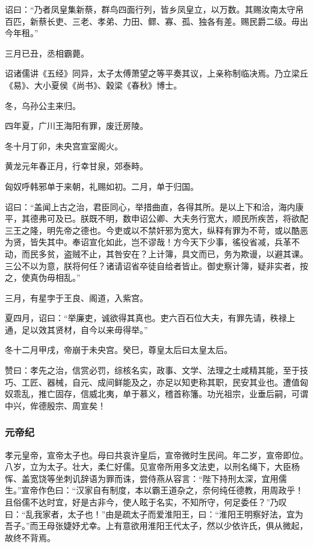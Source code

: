 \documentclass[]{article}
\begin{document}
诏曰：``乃者凤皇集新蔡，群鸟四面行列，皆乡凤皇立，以万数。其赐汝南太守帛百匹，新蔡长吏、三老、孝弟、力田、鳏、寡、孤、独各有差。赐民爵二级。毋出今年租。''

三月已丑，丞相霸薨。

诏诸儒讲《五经》同异，太子太傅萧望之等平奏其议，上亲称制临决焉。乃立梁丘《易》、大小夏侯《尚书》、穀梁《春秋》博士。

冬，乌孙公主来归。

四年夏，广川王海阳有罪，废迁房陵。

冬十月丁卯，未央宫宣室阁火。

黄龙元年春正月，行幸甘泉，郊泰畤。

匈奴呼韩邪单于来朝，礼赐如初。二月，单于归国。

诏曰：``盖闻上古之治，君臣同心，举措曲直，各得其所。是以上下和洽，海内康平，其德弗可及已。朕既不明，数申诏公卿、大夫务行宽大，顺民所疾苦，将欲配三王之隆，明先帝之德也。今吏或以不禁奸邪为宽大，纵释有罪为不苛，或以酷恶为贤，皆失其中。奉诏宣化如此，岂不谬哉！方今天下少事，徭役省减，兵革不动，而民多贫，盗贼不止，其咎安在？上计簿，具文而已，务为欺谩，以避其课。三公不以为意，朕将何任？诸请诏省卒徒自给者皆止。御史察计簿，疑非实者，按之，使真伪毋相乱。''

三月，有星孛于王良、阁道，入紫宫。

夏四月，诏曰：``举廉吏，诚欲得其真也。吏六百石位大夫，有罪先请，秩禄上通，足以效其贤材，自今以来毋得举。''

冬十二月甲戌，帝崩于未央宫。癸巳，尊皇太后曰太皇太后。

赞曰：孝先之治，信赏必罚，综核名实，政事、文学、法理之士咸精其能，至于技巧、工匠、器械，自元、成间鲜能及之，亦足以知吏称其职，民安其业也。遭值匈奴乖乱，推亡固存，信威北夷，单于慕义，稽首称籓。功光祖宗，业垂后嗣，可谓中兴，侔德殷宗、周宣矣！

\hypertarget{header-n879}{%
\subsubsection{元帝纪}\label{header-n879}}

孝元皇帝，宣帝太子也。母曰共哀许皇后，宣帝微时生民间。年二岁，宣帝即位。八岁，立为太子。壮大，柔仁好儒。见宣帝所用多文法吏，以刑名绳下，大臣杨恽、盖宽饶等坐刺讥辞语为罪而诛，尝侍燕从容言：``陛下持刑太深，宜用儒生。''宣帝作色曰：``汉家自有制度，本以霸王道杂之，奈何纯任德教，用周政乎！且俗儒不达时宜，好是古非今，使人眩于名实，不知所守，何足委任？''乃叹曰：``乱我家者，太子也！''由是疏太子而爱淮阳王，曰：``淮阳王明察好法，宜为吾子。''而王母张婕妤尤幸。上有意欲用淮阳王代太子，然以少依许氏，俱从微起，故终不背焉。
\end{document}
